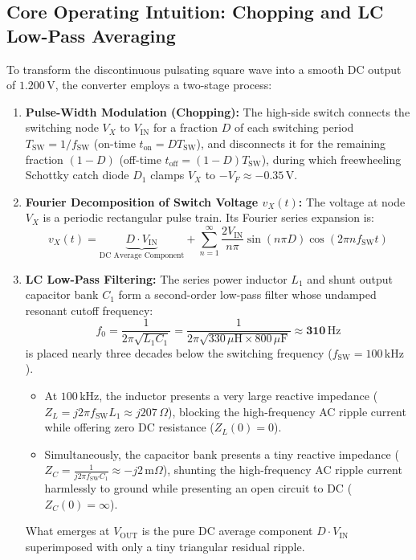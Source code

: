 \documentclass[11pt,a4paper]{article}
\begin{document}
\subsection{Core Operating Intuition: Chopping and LC Low-Pass Averaging}
To transform the discontinuous pulsating square wave into a smooth DC output of $1.200\,\mathrm{V}$, the converter employs a two-stage process:
\begin{enumerate}
    \item \textbf{Pulse-Width Modulation (Chopping):} The high-side switch connects the switching node $V_X$ to $V_{\mathrm{IN}}$ for a fraction $D$ of each switching period $T_{\mathrm{SW}} = 1/f_{\mathrm{SW}}$ (on-time $t_{\mathrm{on}} = D T_{\mathrm{SW}}$), and disconnects it for the remaining fraction $(1 - D)$ (off-time $t_{\mathrm{off}} = (1 - D) T_{\mathrm{SW}}$), during which freewheeling Schottky catch diode $D_1$ clamps $V_X$ to $-V_F \approx -0.35\,\mathrm{V}$.
    \item \textbf{Fourier Decomposition of Switch Voltage $v_X(t)$:} The voltage at node $V_X$ is a periodic rectangular pulse train. Its Fourier series expansion is:
    \begin{equation}
        v_X(t) = \underbrace{D \cdot V_{\mathrm{IN}}}_{\text{DC Average Component}} + \sum_{n=1}^\infty \frac{2 V_{\mathrm{IN}}}{n\pi} \sin(n\pi D) \cos(2\pi n f_{\mathrm{SW}} t)
        \label{eq:fourier}
    \end{equation}
    \item \textbf{LC Low-Pass Filtering:} The series power inductor $L_1$ and shunt output capacitor bank $C_1$ form a second-order low-pass filter whose undamped resonant cutoff frequency:
    \begin{equation}
        f_0 = \frac{1}{2\pi \sqrt{L_1 C_1}} = \frac{1}{2\pi \sqrt{330\,\mu\mathrm{H} \times 800\,\mu\mathrm{F}}} \approx \mathbf{310\,\mathrm{Hz}}
    \end{equation}
    is placed nearly three decades below the switching frequency ($f_{\mathrm{SW}} = 100\,\mathrm{kHz}$).
    \begin{itemize}
        \item At $100\,\mathrm{kHz}$, the inductor presents a very large reactive impedance ($Z_L = j 2\pi f_{\mathrm{SW}} L_1 \approx j 207\,\Omega$), blocking the high-frequency AC ripple current while offering zero DC resistance ($Z_L(0) = 0$).
        \item Simultaneously, the capacitor bank presents a tiny reactive impedance ($Z_C = \frac{1}{j 2\pi f_{\mathrm{SW}} C_1} \approx -j 2\,\mathrm{m}\Omega$), shunting the high-frequency AC ripple current harmlessly to ground while presenting an open circuit to DC ($Z_C(0) = \infty$).
    \end{itemize}
    What emerges at $V_{\mathrm{OUT}}$ is the pure DC average component $D \cdot V_{\mathrm{IN}}$ superimposed with only a tiny triangular residual ripple.
\end{enumerate}
\end{document}
